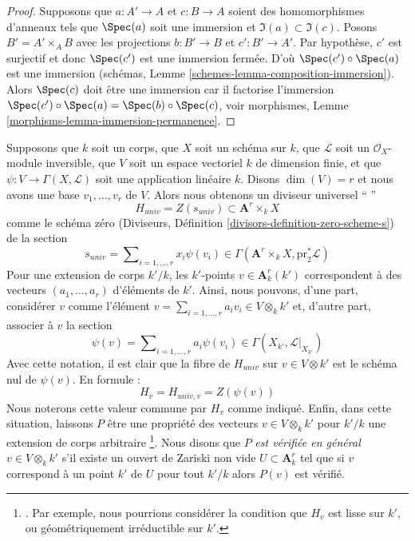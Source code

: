\begin{proof}
\medskip\noindent
Supposons que $a : A' \to A$ et $c : B \to A$ soient des
homomorphismes d'anneaux tels que $\Spec(a)$ soit une
immersion et $\Im(a) \subset \Im(c)$. Posons $B' = A' \times_A
B$ avec les projections $b : B' \to B$ et $c' : B' \to A'$. Par
hypothèse, $c'$ est surjectif et donc $\Spec(c')$ est une
immersion fermée. D'où $\Spec(c') \circ \Spec(a)$ est une
immersion (schémas, Lemme
\ref{schemes-lemma-composition-immersion}). Alors $\Spec(c)$ doit être une
immersion car il factorise l'immersion $\Spec(c') \circ \Spec(a) = \Spec(b)
\circ \Spec(c)$, voir morphismes, Lemme \ref{morphisms-lemma-immersion-permanence}.
\end{proof}

\begin{situation}
\label{situation-family-divisors}
Supposons que $k$ soit un corps, que $X$ soit un
schéma sur $k$, que $\mathcal{L}$ soit un
$\mathcal{O}_X$-module inversible, que $V$ soit un espace
vectoriel $k$ de dimension finie, et que $\psi : V \to
\Gamma(X, \mathcal{L})$ soit une application linéaire $k$.
Disons $\dim(V) = r$ et nous avons une base $v_1, \ldots,
v_r$ de $V$. Alors nous obtenons un diviseur universel `` ''
$$
H_{univ} = Z(s_{univ}) \subset  \mathbf{A}^r \times_k X
$$
comme le schéma zéro (Diviseurs, Définition
\ref{divisors-definition-zero-scheme-s}) de la section
$$
s_{univ} = \sum\nolimits_{i = 1, \ldots, r} x_i \psi(v_i) \in
\Gamma(\mathbf{A}^r \times_k X, \text{pr}_2^*\mathcal{L})
$$
Pour une extension de corps $k'/k$, les $k'$-points $v \in
\mathbf{A}^r_k(k')$ correspondent à des vecteurs $(a_1, \ldots,
a_r)$ d'éléments de $k'$. Ainsi, nous pouvons, d'une part,
considérer $v$ comme l'élément $v = \sum_{i = 1, \ldots, r} a_i
v_i \in V \otimes_k k'$ et, d'autre part, associer à $v$ la section
$$
\psi(v) = \sum\nolimits_{i = 1, \ldots, r} a_i \psi(v_i) \in
\Gamma(X_{k'}, \mathcal{L}|_{X_{k'}})
$$
Avec cette notation, il est clair que la
fibre de $H_{univ}$ sur $v \in V \otimes k'$
est le schéma nul de $\psi(v)$. En formule :
$$
H_v = H_{univ, v} = Z(\psi(v))
$$
Nous noterons cette valeur commune par $H_v$ comme indiqué. Enfin, dans
cette situation, laissons $P$ être une propriété des vecteurs $v \in V
\otimes_k k'$ pour $k'/k$ une extension de corps arbitraire \footnote {.
Par exemple, nous pourrions considérer la condition que $H_v$ est lisse
sur $k'$, ou géométriquement irréductible sur $k'$. }. Nous disons que
$P$ {\it est vérifiée en général } $v \in V \otimes_k k'$ s'il existe un
ouvert de Zariski non vide $U \subset \mathbf{A}^r_k$ tel que si $v$
correspond à un point $k'$ de $U$ pour tout $k'/k$ alors $P(v)$ est vérifié.
\end{situation}

